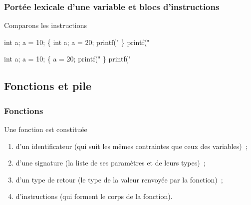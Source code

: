 \begin{frame}[fragile]
\frametitle{Portée lexicale d'une variable et blocs d'instructions}
Comparons les instructions
\begin{multicols}{2}
\begin{semiverbatim}\small
int a;
a = 10;
\{
    int a;
    a = 20;
    printf("%
\}
printf("%
\end{semiverbatim}
\begin{semiverbatim}\small
int a;
a = 10;
\{
    a = 20;
    printf("%
\}
printf("%
\end{semiverbatim}
\end{multicols}
\bigskip


\end{frame}

\subsection{Fonctions et pile}

\begin{frame}[fragile] \frametitle{Fonctions}
Une \alert{fonction} est constituée
\begin{enumerate}
    \item d'un identificateur (qui suit les mêmes contraintes que ceux des
    variables)~;
    \item d'une signature (la liste de ses paramètres et de leurs types)~;
    \item d'un type de retour (le type de la valeur renvoyée par la fonction)~;
    \item d'instructions (qui forment le corps de la fonction).
\end{enumerate}
\bigskip


\begin{semiverbatim}
\end{semiverbatim}
\end{frame}

